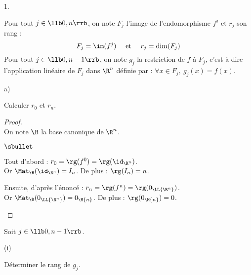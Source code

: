 \documentclass[11pt]{article}%
\begin{document}
\begin{noliste}{1.}
  
  \newpage
  
  
\item Pour tout $j \in \llb 0,n \rrb$, on note $F_j$ l'image de
  l'endomorphisme $f^j$ et $r_j$ son rang : 
  \[
  F_j = \im(f^j) \quad \text{ et } \quad r_j = \dim(F_j)
  \]
  Pour tout $j \in \llb 0, n-1 \rrb$, on note $g_j$ la restriction de
  $f$ à $F_j$, c'est à dire l'application linéaire de $F_j$ dans
  $\R^n$ définie par : $\forall x \in F_j, \ g_j(x)=f(x)$.
  \begin{noliste}{a)}
    \setlength{\itemsep}{2mm}
    \item Calculer $r_0$ et $r_n$.
    
    \begin{proof}~\\
    On note $\B$ la base canonique de $\R^n$.
    \begin{noliste}{$\sbullet$}
    \item Tout d'abord : $r_0 = \rg(f^0) = \rg(\id_{\R^n})$.\\[.1cm]
      Or $\Mat_\B(\id_{\R^n})=I_n$. De plus : $\rg(I_n)=n$. %
      
    \item Ensuite, d'après l'énoncé : $r_n = \rg(f^n) =
      \rg(0_{\LL{\R^n}})$.\\[.1cm]
      Or $\Mat_\B(0_{\LL{\R^n}}) = 0_{\M{n}}$. De plus :
      $\rg(0_{\M{n}}) = 0$.
      ~\\[-1.4cm]
    \end{noliste}
  \end{proof}

    
    \item Soit $j \in \llb 0,n-1\rrb$.
    \begin{nonoliste}{(i)}
      \item Déterminer le rang de $g_j$.
    \end{nonoliste}


\end{noliste}
\end{noliste}
\end{document}
